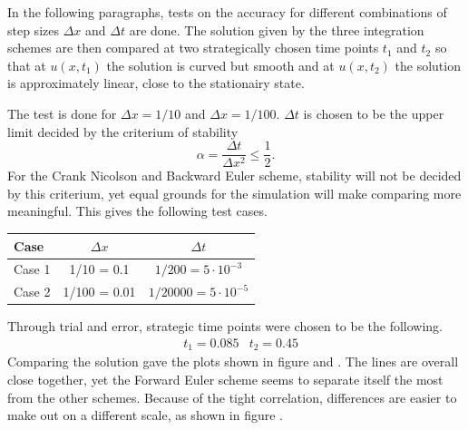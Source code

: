 In the following paragraphs, tests on the accuracy for different
combinations of step sizes $\Delta x$ and $\Delta t$ are done. The
solution given by the three integration schemes are then compared
at two strategically chosen time points $t_1$ and $t_2$ so that at
$u(x, t_1)$ the solution is curved but smooth and at $u(x, t_2)$
the solution is approximately linear, close to the stationairy
state.

The test is done for $\Delta x = 1/10$ and $\Delta x = 1/100$.
$\Delta t$ is chosen to be the upper limit decided by the criterium
of stability \[ \alpha = \frac{\Delta t}{\Delta x^2} \leq
\frac{1}{2}. \] For the Crank Nicolson and Backward Euler scheme,
stability will not be decided by this criterium, yet equal grounds
for the simulation will make comparing more meaningful. This gives
the following test cases.

\begin{center}
\begin{tabular}[htbp]{|l|c|c|}
    \hline
    Case & $\Delta x$ & $\Delta t$ \\
    \hline
    \hline
    Case 1 & 1/10 = 0.1 & $1/200 = 5 \cdot 10^{-3}$ \\
    \hline
    Case 2 & 1/100 = 0.01 & $1/20000 = 5 \cdot 10^{-5}$ \\
    \hline
\end{tabular}
\end{center}

Through trial and error, strategic time points were chosen to be
the following.
\begin{align*}
    & t_1 = 0.085 & t_2 = 0.45
\end{align*}
Comparing the solution gave the plots shown in figure
 and . The lines are overall close
together, yet the Forward Euler scheme seems to separate itself the
most from the other schemes. Because of the tight correlation,
differences are easier to make out on a different scale, as shown
in figure .

